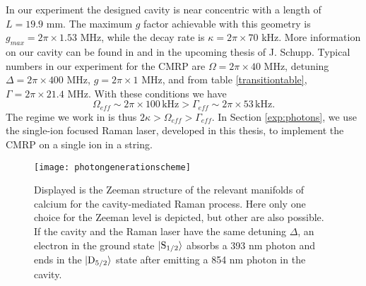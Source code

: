 In our experiment the designed cavity is near concentric with a length of $L = 19.9$ mm. The maximum $g$ factor achievable with this geometry is $g_{max} = 2\pi \times 1.53$ MHz, while the decay rate is $\kappa = 2\pi\times 70$ kHz. More information on our cavity can be found in \cite{Krutyanskiy2019} and in the upcoming thesis of J. Schupp. Typical numbers in our experiment for the CMRP are $\Omega =  2\pi\times 40$ MHz, detuning $\Delta = 2\pi\times 400$ MHz, $g = 2\pi\times 1$ MHz, and from table \ref{transitiontable}, $\Gamma = 2\pi \times 21.4$ MHz. With these conditions we have
\[\Omega_{eff} \sim 2\pi\times 100\, \text{kHz} > \Gamma_{eff} \sim 2\pi\times 53\,\text{kHz}.\]
The regime we work in is thus $2\kappa>\Omega_{eff}>\Gamma_{eff}$. In Section \ref{exp:photons}, we use the single-ion focused Raman laser, developed in this thesis, to implement the CMRP on a single ion in a string.
\begin{figure}
     \centering
     \texttt{[image: photongenerationscheme]}
    \caption{Displayed is the Zeeman structure of the relevant manifolds of calcium for the cavity-mediated Raman process. Here only one choice for the Zeeman level is depicted, but other are also possible. If the cavity and the Raman laser have the same detuning $\Delta$, an electron in the ground state $\ket{\text{S}_{1/2}}$ absorbs a 393 nm photon and ends in the $\ket{\text{D}_{5/2}}$ state after emitting a 854 nm photon in the cavity.}
      \label{ramanprocess}
\end{figure}



